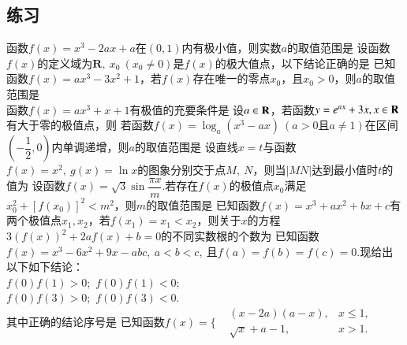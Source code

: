 \subsection{练习}
\begin{questions}
\qs 函数$f(x)=x^3-2ax+a$在$ (0,1) $内有极小值，则实数$ a $的取值范围是\xx
{}
\qs 设函数$f(x)$的定义域为$ \mathbf{R} ,~x_0~(x_0\ne 0)$是$f(x)$的极大值点，以下结论正确的是\xx
{}
\qs
已知函数$f(x)=ax^3-3x^2+1$，若$f(x)$存在唯一的零点$x_0$，且$x_0>0$，则$a$的取值范围是\\
\mbox{\hspace{2em}}\hfill\xx
{}
\qs 函数$f(x)=ax^3+x+1$有极值的充要条件是\xx
{}
\qs 设$ a\in\mathbf{R} $，若函数$y=e^{ax}+3x,x\in\mathbf{R} $有大于零的极值点，则\xx
{}
\qs 若函数$f(x)=\log_a(x^3-ax)~(a>0\text{且}a\ne 1)$在区间$ \left(-\dfrac{1}{2},0\right) $内单调递增，则$ a $的取值范围是\xx
\onech{$ \left[\dfrac{1}{4},~1\right) $}{$ \left[\dfrac{3}{4},~1\right) $}{$ \left(\dfrac{9}{4},~+\infty\right) $}{$ \left(1,~\dfrac{9}{4}\right) $}
\qs 设直线$ x=t $与函数$ f(x)=x^2 ,~g(x)=\ln x$的图象分别交于点$ M,~N $，则当$ \left|MN\right| $达到最小值时$ t $的值为\xx
{}
\qs
设函数$f(x)=\sqrt{3}\sin\dfrac{\pi x}{m}$.若存在$f(x)$的极值点$x_0$满足$x_0^2+\left[f(x_0)\right]^2<m^2$，则$m$的取值范围是\xx
{}
\qs 已知函数$f(x)=x^3+ax^2+bx+c$有两个极值点$x_1,x_2$，若$f(x_1)=x_1<x_2$，则关于$x$的方程$3(f(x))^2+2af(x)+b=0$的不同实数根的个数为\xx
{}
\qs 已知函数$f(x)=x^3-6x^2+9x-abc,~a<b<c,~$且$ f(a)=f(b)=f(c)=0 $.现给出以下如下结论：\\
$f(0)f(1)>0$;\ $f(0)f(1)<0$;\\
$f(0)f(3)>0$;\ $f(0)f(3)<0$.\\
其中正确的结论序号是\xx
{}
\qs 已知函数$f(x)=\Bigg\{\begin{aligned}
&(x-2a)(a-x),&x\le 1,\\&\sqrt{x}+a-1,&x>1.
\end{aligned}$\\
\begin{parts}

\end{parts}
\end{questions}
